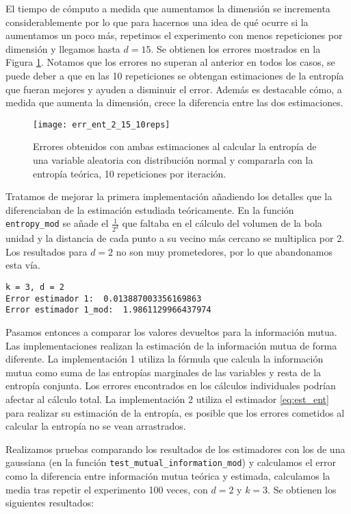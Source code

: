 \documentclass[10pt,a4paper]{article} %
\theoremstyle{definition}
\begin{document}
El tiempo de cómputo a medida que aumentamos la dimensión se incrementa considerablemente por lo que para hacernos una idea de qué ocurre si la aumentamos un poco más, repetimos el experimento con menos repeticiones por dimensión y llegamos hasta $d = 15$. Se obtienen los errores mostrados en la Figura \ref{fig:err_ent15}. Notamos que los errores no superan al anterior en todos los casos, se puede deber a que en las 10 repeticiones se obtengan estimaciones de la entropía que fueran mejores y ayuden a disminuir el error. Además es destacable cómo, a medida que aumenta la dimensión, crece la diferencia entre las dos estimaciones.

\begin{figure}[H]
    \centering
    \texttt{[image: err\_ent\_2\_15\_10reps]}
    \caption{Errores obtenidos con ambas estimaciones al calcular la entropía de una variable aleatoria con distribución normal y compararla con la entropía teórica, 10 repeticiones por iteración.}
    \label{fig:err_ent15}
\end{figure}


Tratamos de mejorar la primera implementación añadiendo los detalles que la diferenciaban de la estimación estudiada teóricamente. En la función \texttt{entropy\_mod} se añade el $\frac{1}{2^d}$ que faltaba en el cálculo del volumen de la bola unidad y la distancia de cada punto a su vecino más cercano se multiplica por 2. Los resultados para $d = 2$ no son muy prometedores, por lo que abandonamos esta vía.

\begin{lstlisting}
k = 3, d = 2
Error estimador 1:  0.013887003356169863
Error estimador 1_mod:  1.9861129966437974
\end{lstlisting}


Pasamos entonces a comparar los valores devueltos para la información mutua. Las implementaciones realizan la estimación de la información mutua de forma diferente. La implementación 1 utiliza la fórmula que calcula la información mutua como suma de las entropías marginales de las variables y resta de la entropía conjunta. Los errores encontrados en los cálculos individuales podrían afectar al cálculo total. La implementación 2 utiliza el estimador \ref{eq:est_ent} para realizar su estimación de la entropía, es posible que los errores cometidos al calcular la entropía no se vean arrastrados.

Realizamos pruebas comparando los resultados de los estimadores con los de una gaussiana (en la función \texttt{test\_mutual\_information\_mod}) y calculamos el error como la diferencia entre información mutua teórica y estimada, calculamos la media tras repetir el experimento 100 veces, con $d=2$ y $k=3$. Se obtienen los siguientes resultados:
\end{document}
